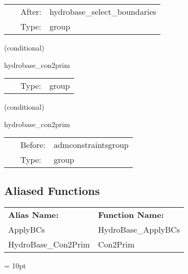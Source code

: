 \hspace{5mm}{\it apply the boundary conditions of hydrobase } 


\hspace{5mm}

 \begin{tabular*}{160mm}{cll} 
~ & After:  & hydrobase\_select\_boundaries \\ 
~ & Type:  & group \\ 
\end{tabular*} 


\vspace{5mm}

   (conditional) 

\hspace{5mm} hydrobase\_con2prim 

\hspace{5mm}{\it convert from conservative to primitive variables } 


\hspace{5mm}

 \begin{tabular*}{160mm}{cll} 
~ & Type:  & group \\ 
\end{tabular*} 


\vspace{5mm}

   (conditional) 

\hspace{5mm} hydrobase\_con2prim 

\hspace{5mm}{\it convert from conservative to primitive variables (might be redundant) } 


\hspace{5mm}

 \begin{tabular*}{160mm}{cll} 
~ & Before:  & admconstraintsgroup \\ 
~ & Type:  & group \\ 
\end{tabular*} 


\subsection*{Aliased Functions}

\hspace{5mm}

 \begin{tabular*}{160mm}{ll} 

{\bf Alias Name:} ~~~~~~~ & {\bf Function Name:} \\ 
ApplyBCs & HydroBase\_ApplyBCs \\ 
HydroBase\_Con2Prim & Con2Prim \\ 
\end{tabular*} 



\vspace{5mm}\parskip = 10pt 

